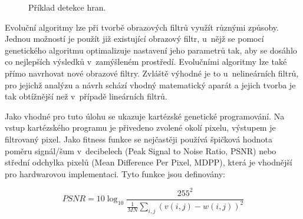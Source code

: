 \begin{figure}[htb]
    \centering
    \hskip1.5cm
    \caption{Příklad detekce hran.}
    \label{obrDetektor}
\end{figure}



Evoluční algoritmy lze při tvorbě obrazových filtrů využít různými způsoby. Jednou možností je použít již existující obrazový filtr, u~nějž se pomocí genetického algoritmu optimalizuje nastavení jeho parametrů tak, aby se dosáhlo co nejlepších výsledků v~zamýšleném prostředí. Evolučními algoritmy lze také přímo navrhovat nové obrazové filtry. Zvláště výhodné je to u~nelineárních filtrů, pro jejichž analýzu a návrh schází vhodný matematický aparát a jejich tvorba je tak obtížnější než v~případě lineárních filtrů.

Jako vhodné pro tuto úlohu se ukazuje kartézské genetické programování. Na vstup kartézského programu je přivedeno zvolené okolí pixelu, výstupem je filtrovaný pixel. Jako fitness funkce se nejčastěji používá špičková hodnota poměru signál/šum v~decibelech (Peak Signal to Noise Ratio, PSNR) nebo střední odchylka pixelů (Mean Difference Per Pixel, MDPP), která je vhodnější pro hardwarovou implementaci. Tyto funkce jsou definovány:

\begin{equation}
    \label{eqPSNR}
    \mathit{PSNR} = 10 \log_{10} \frac{255^2}{\frac{1}{MN} \sum\limits_{i,j} \left( v\left( i, j \right) - w\left( i, j \right)  \right)^2 }
\end{equation}


